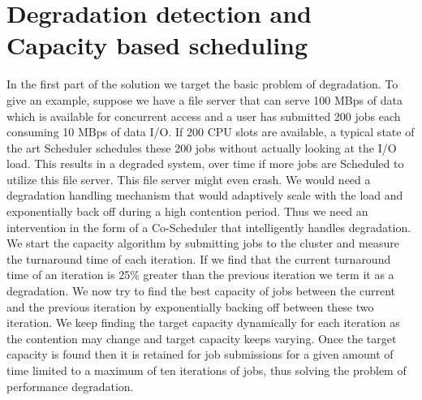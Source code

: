\documentclass[ms,electronic,double]{nuthesis}
\begin{document}
\section{Degradation detection and Capacity based scheduling}
In the first part of the solution we target the basic problem of degradation. To give an example, suppose
we have a file server that can serve 100 MBps of data which is available for concurrent access and a user has submitted 200 jobs
each consuming 10 MBps of data I/O. If 200 CPU slots are available, a typical state of the art Scheduler
schedules these 200 jobs without actually looking at the I/O load. This results in a degraded system, 
over time if more jobs are Scheduled to utilize this file server. This file server might even crash. We would need a 
degradation handling mechanism that would adaptively scale with the load and  exponentially 
back off during a high contention period. Thus we need an intervention in the form
of a Co-Scheduler that intelligently handles degradation. 
We start the capacity algorithm by submitting jobs to the cluster and measure 
the turnaround time of each iteration. If we find that the current turnaround 
time of an iteration is 25\% greater than the previous iteration we term it as a 
degradation. We now try to find the best capacity of jobs between the current 
and the previous iteration by exponentially backing off between these two iteration. We keep finding the 
target capacity dynamically for each iteration as the contention may change and target capacity keeps 
 varying. Once the target capacity is found then it is retained for job submissions for a given amount of time
 limited to a maximum of ten iterations of jobs, thus solving the problem of performance degradation. 
\end{document}
